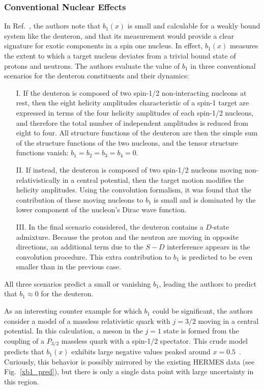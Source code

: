 \subsubsection{Conventional Nuclear Effects}
In Ref.~\cite{Hoodbhoy:1988am}, the authors note that $b_1(x)$ is small and calculable for
a weakly bound system like the deuteron, and that its measurement would provide a clear signature 
for exotic components in a spin one nucleus.  In effect, $b_1(x)$ measures the extent to which a target nucleus deviates from a trivial bound state of protons and neutrons.
The authors evaluate the value of $b_1$ in three conventional scenarios for the deuteron
constituents and their dynamics:
\begin{enumerate}
 \item[I.] If the deuteron is composed of two spin-1/2 non-interacting nucleons at rest,
then the eight helicity amplitudes characteristic of a spin-1 target are 
expressed in terms of the four helicity amplitudes of each spin-1/2 nucleons, and 
therefore the total number of independent amplitudes is reduced from eight to four. All structure 
functions of the deuteron are then the simple sum of the structure functions of the two 
nucleons, and the tensor structure functions vanish: $b_1 = b_2 
= b_3 = b_4 = 0$. 
 \item[II.] If instead, the deuteron is composed of two spin-1/2 nucleons moving non-relativistically 
in a central potential, then the target motion modifies the helicity amplitudes. Using
the convolution formalism, it was found that the contribution of these moving nucleons
to $b_1$ is small and is dominated by the lower component of the nucleon's Dirac
wave function.
 \item[III.] In the final scenario considered, the deuteron contains a $D$-state admixture. Because the proton and the neutron
are moving in opposite directions, an additional term due to the $S-D$ interference 
appears in the convolution procedure. This extra contribution to $b_1$ is predicted
to be even smaller than in the previous case.
\end{enumerate}

All three scenarios predict a small or vanishing $b_1$, leading the authors to predict that
$b_1\approx 0$ for the deuteron. 

As an interesting counter example for which 
$b_1$ could be significant, the authors consider a model of a massless relativistic
quark with $j=3/2$ moving in a central potential.  In this calculation, a meson in the $j=1$ state is formed from the coupling of a $P_{3/2}$
massless quark with a spin-1/2 spectator.  This crude model predicts that
$b_1(x)$ exhibits large negative values peaked around $x=0.5$~\cite{Hoodbhoy:1988am}.  
Curiously, this behavior is possibly mirrored by the existing HERMES data (see Fig.~\ref{xb1_pred}), but there is only a single data point with large uncertainty in this region.


